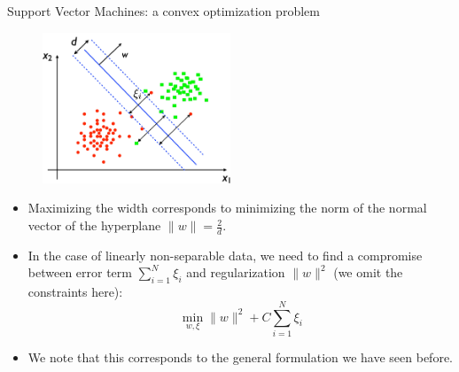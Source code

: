 \documentclass[xcolor=pdftex,dvipsnames,table]{beamer}
\begin{document}
\begin{frame}{Support Vector Machines: a convex optimization problem}
	\begin{figure}[htb]
		\includegraphics[width=0.5\textwidth]{../graphics/SVM_nonsep.pdf}
	\end{figure}
	\begin{itemize}
		\item Maximizing the width corresponds to minimizing the norm of the normal vector of the hyperplane $\|w\| = \frac{2}{d}$. 
		\item In the case of linearly non-separable data, we need to find a compromise between error term $\sum_{i=1}^{N}\xi_i$ and regularization $\|w\|^2$ (we omit the constraints here):
		\begin{equation*}
			\min_{w,\xi} \|w\|^2 + C \sum_{i=1}^{N}\xi_i
		\end{equation*}
		\item We note that this corresponds to the general formulation we have seen before.
	\end{itemize}
\end{frame}

\end{document}
